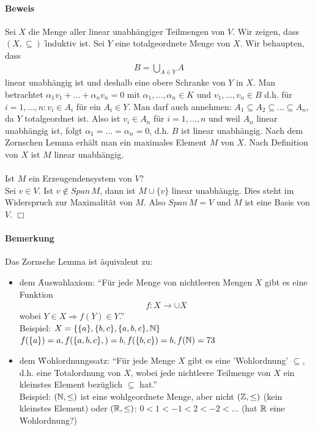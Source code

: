\paragraph{Beweis}
Sei $X$ die Menge aller linear unabhängiger Teilmengen von $V$. Wir zeigen, dass $(X, \subseteq)$ \f{induktiv} ist. Sei $Y$ eine totalgeordnete Menge von $X$. Wir behaupten, dass
\begin{align}
 B = \bigcup _{A \in Y} A
\end{align}
linear unabhängig ist und deshalb eine obere Schranke von $Y$ in $X$. Man betrachtet $\alpha_1 v_1 + ... + \alpha_n v_n = 0$ mit $\alpha_1, ..., \alpha_n \in K$ und $v_1, ..., v_n \in B$ d.h. für $i=1, ..., n: v_i \in A_i$ für ein $A_i \in Y$. Man darf auch annehmen: $A_1 \subseteq A_2 \subseteq ... \subseteq A_n$, da $Y$ totalgeordnet ist. Also ist $v_i \in A_n$ für $i = 1, ..., n$ und weil $A_n$ linear unabhängig ist, folgt $\alpha_1 = ... = \alpha_n = 0$, d.h. $B$ ist linear unabhängig.
Nach dem Zornschen Lemma erhält man ein maximales Element $M$ von $X$. Nach Definition von $X$ ist $M$ linear unabhängig.\\\\
Ist $M$ ein Erzeugendensystem von $V$?\\
Sei $v \in V$. Ist $v \notin Span\, M$, dann ist $M \cup \{v\}$ linear unabhängig. Dies steht im Widerspruch zur Maximalität von $M$. Also $Span\, M = V$ und $M$ ist eine Basis von $V$. \hfill $\Box$

\paragraph{Bemerkung}
Das Zornsche Lemma ist äquivalent zu:
\begin{itemize}
\item dem \f{Auswahlaxiom}: ``Für jede Menge von nichtleeren Mengen $X$ gibt es eine Funktion
\begin{align}
f: X \rightarrow \cup X
\end{align}
wobei $Y \in X \Rightarrow f(Y) \in Y$.''\\
Beispiel: $X = \{\{a\}, \{b, c\}, \{a, b, c\}, \mathbb{N}\}$\\
$f(\{a\}) = a, f(\{a, b, c\},) = b, f(\{b, c\}) = b, f(\mathbb{N}) = 73$
\item dem \f{Wohlordnungssatz}: ``Für jede Menge $X$ gibt es eine 'Wohlordnung' $\subseteq$, d.h. eine Totalordnung von $X$, wobei jede nichtleere Teilmenge von $X$ ein kleinstes Element bezüglich $\subseteq$ hat.''\\
Beispiel: $(\mathbb{N}, \leq)$ ist eine wohlgeordnete Menge, aber nicht $(\mathbb{Z}, \leq)$ (kein kleinstes Element) oder $(\mathbb{R}, \leq)$: $0 < 1 < -1 < 2 < -2 < ...$ (hat $\mathbb{R}$ eine Wohlordnung?)
\end{itemize}

